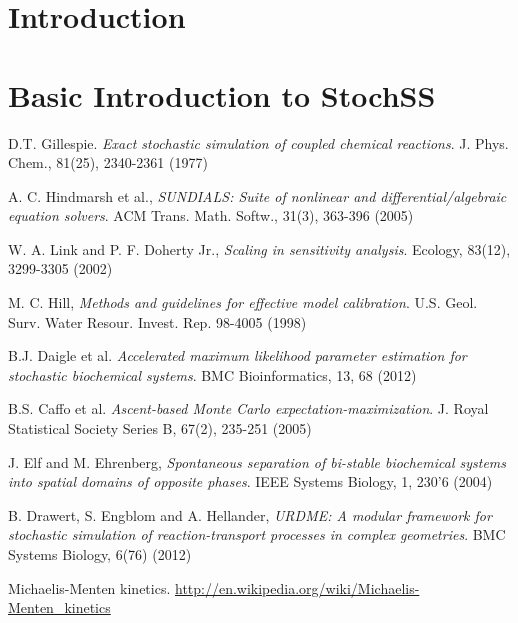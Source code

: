 \documentclass[report,openany]{memoir}
\title{\rightline{\HUGE StochSS: Stochastic Simulation Service}}
\date{}
\begin{document}
\maketitle

\tableofcontents

\chapter{Introduction}



\chapter{Basic Introduction to StochSS}
\label{chapter1}








\begin{thebibliography}{9}

  D.T. Gillespie.
  \textit{Exact stochastic simulation of coupled chemical reactions}.
  J. Phys. Chem., 81(25), 2340-2361 (1977)

  A. C. Hindmarsh et al.,
  \textit{SUNDIALS: Suite of nonlinear and differential/algebraic equation solvers}.
  ACM Trans. Math. Softw., 31(3), 363-396 (2005)
  
  W. A. Link and P. F. Doherty Jr.,
  \textit{Scaling in sensitivity analysis}.
  Ecology, 83(12), 3299-3305 (2002)
  
  M. C. Hill,
  \textit{Methods and guidelines for effective model calibration}. 
  U.S. Geol. Surv. Water Resour. Invest. Rep. 98-4005 (1998)
  
  B.J. Daigle et al.
  \textit{Accelerated maximum likelihood parameter estimation for stochastic biochemical systems}.
  BMC Bioinformatics, 13, 68 (2012)
  
  B.S. Caffo et al.
  \textit{Ascent-based Monte Carlo expectation-maximization}. 
  J. Royal Statistical Society Series B, 67(2), 235-251 (2005)
  
  J. Elf and M. Ehrenberg,
  \textit{Spontaneous separation of bi-stable biochemical systems into spatial domains of opposite phases}. IEEE Systems Biology, 1, 230'6 (2004)
  
 B. Drawert, S. Engblom and A. Hellander, 
 \textit{URDME: {A} modular framework for stochastic simulation
of reaction-transport processes in complex geometries}. BMC Systems Biology, 6(76) (2012)
  
  Michaelis-Menten kinetics. 
  \url{http://en.wikipedia.org/wiki/Michaelis-Menten_kinetics}
  
\end{thebibliography}
\end{document}
